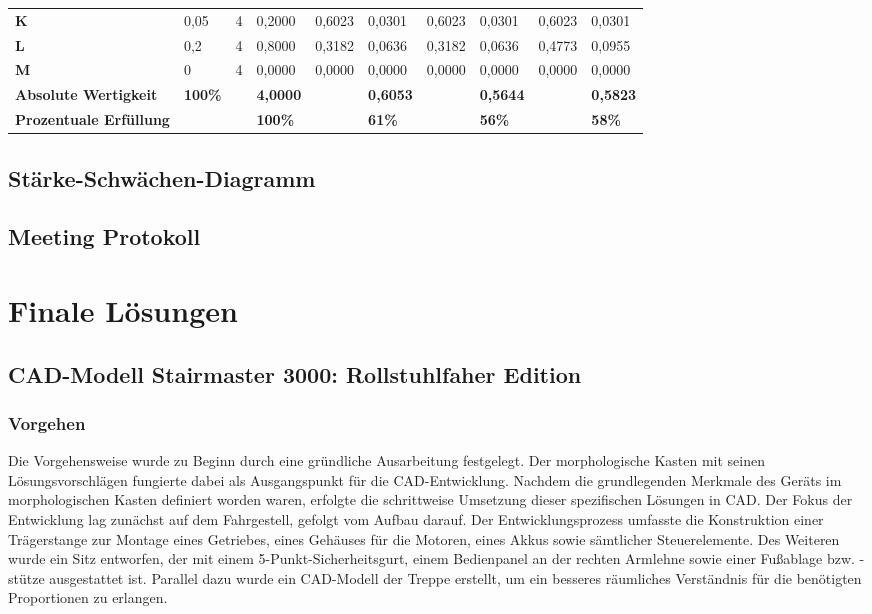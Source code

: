 \documentclass[10pt,a4paper]{article}
\begin{document}
\begin{tabular}{>{\bfseries}p{1.5cm} p{1.5cm} p{1.5cm} p{1.5cm} p{1.5cm} p{1.5cm} p{1.5cm} p{1.5cm} p{1.5cm} p{1.5cm}}
    K                              & 0,05           & 4               & 0,2000          & 0,6023 & 0,0301          & 0,6023 & 0,0301          & 0,6023 & 0,0301          \\
    L                              & 0,2            & 4               & 0,8000          & 0,3182 & 0,0636          & 0,3182 & 0,0636          & 0,4773 & 0,0955          \\
    M                              & 0              & 4               & 0,0000          & 0,0000 & 0,0000          & 0,0000 & 0,0000          & 0,0000 & 0,0000          \\
    \midrule
    \textbf{Absolute Wertigkeit}   & \textbf{100\%} &                 & \textbf{4,0000} &        & \textbf{0,6053} &        & \textbf{0,5644} &        & \textbf{0,5823} \\
    \textbf{Prozentuale Erfüllung} &                &                 & \textbf{100\%}  &        & \textbf{61\%}   &        & \textbf{56\%}   &        & \textbf{58\%}   \\
    \bottomrule
\end{tabular}

\subsection{Stärke-Schwächen-Diagramm}
\subsection{Meeting Protokoll}
\newpage
\section{Finale Lösungen}

\subsection{CAD-Modell Stairmaster 3000: Rollstuhlfaher Edition}
\subsubsection{Vorgehen}
Die Vorgehensweise wurde zu Beginn durch eine gründliche Ausarbeitung festgelegt. Der morphologische Kasten mit seinen Lösungsvorschlägen fungierte dabei als Ausgangspunkt für die CAD-Entwicklung. Nachdem die grundlegenden Merkmale des Geräts im morphologischen Kasten definiert worden waren, erfolgte die schrittweise Umsetzung dieser spezifischen Lösungen in CAD. Der Fokus der Entwicklung lag zunächst auf dem Fahrgestell, gefolgt vom Aufbau darauf. Der Entwicklungsprozess umfasste die Konstruktion einer Trägerstange zur Montage eines Getriebes, eines Gehäuses für die Motoren, eines Akkus sowie sämtlicher Steuerelemente. Des Weiteren wurde ein Sitz entworfen, der mit einem 5-Punkt-Sicherheitsgurt, einem Bedienpanel an der rechten Armlehne sowie einer Fußablage bzw. -stütze ausgestattet ist. Parallel dazu wurde ein CAD-Modell der Treppe erstellt, um ein besseres räumliches Verständnis für die benötigten Proportionen zu erlangen.
\end{document}
